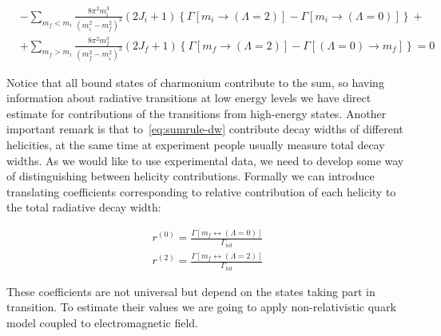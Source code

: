 \begin{align} \label{eq:sumrule-dw}
    &-\sum_{m_f < m_i} \frac{8 \pi^2 m_i^3}{(m_i^2 - m_f^2)^3} (2J_i+1) \left\{\Gamma\left[m_i \rightarrow (\Lambda = 2)\right] - \Gamma\left[m_i \rightarrow (\Lambda = 0)\right] \right\} + \nonumber \\
    &+ \sum_{m_f > m_i} \frac{8 \pi^2 m_f^3}{(m_f^2 - m_i^2)^3} (2J_f+1) \left\{\Gamma\left[m_f \rightarrow (\Lambda = 2)\right] - \Gamma\left[(\Lambda = 0) \rightarrow m_f\right] \right\} = 0
\end{align}

Notice that all bound states of charmonium contribute to the sum, so having information about radiative transitions at low energy levels we have direct estimate for contributions of the transitions from high-energy states. Another important remark is that to~\ref{eq:sumrule-dw} contribute decay widths of different helicities, at the same time at experiment people usually measure total decay widths. As we would like to use experimental data, we need to develop some way of distinguishing between helicity contributions. Formally we can introduce translating coefficients corresponding to relative contribution of each helicity to the total radiative decay width:

\begin{align}
    r^{(0)} = \frac{\Gamma\left[m_f \leftrightarrow (\Lambda=0)\right]}{\Gamma_{tot}} \\
    r^{(2)} = \frac{\Gamma\left[m_f \leftrightarrow (\Lambda=2)\right]}{\Gamma_{tot}}
\end{align}

These coefficients are not universal but depend on the states taking part in transition. To estimate their values we are going to apply non-relativistic quark model coupled to electromagnetic field.
